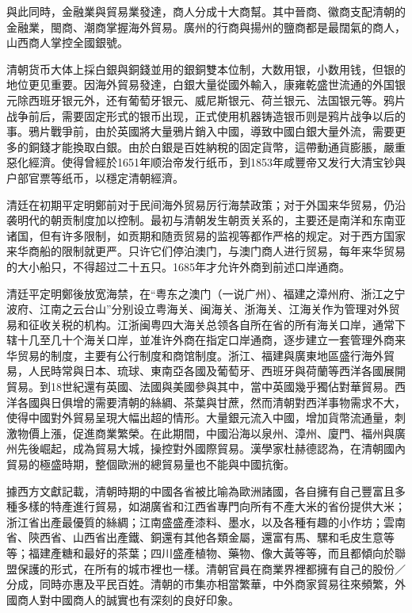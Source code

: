 與此同時，金融業與貿易業發達，商人分成十大商幫。其中晉商、徽商支配清朝的金融業，閩商、潮商掌握海外貿易。廣州的行商與揚州的鹽商都是最闊氣的商人，山西商人掌控全國銀號。

清朝货币大体上採白銀與銅錢並用的銀銅雙本位制，大数用银，小数用钱，但银的地位更见重要。因海外貿易發達，白銀大量從國外輸入，康雍乾盛世流通的外国银元除西班牙银元外，还有葡萄牙银元、威尼斯银元、荷兰银元、法国银元等。鸦片战争前后，需要固定形式的银币出现，正式使用机器铸造银币则是鸦片战争以后的事。鴉片戰爭前，由於英國將大量鴉片銷入中國，導致中國白銀大量外流，需要更多的銅錢才能換取白銀。由於白銀是百姓納稅的固定貨幣，這帶動通貨膨脹，嚴重惡化經濟。使得曾經於1651年顺治帝发行纸币，到1853年咸豐帝又发行大清宝钞與户部官票等纸币，以穩定清朝經濟。

清廷在初期平定明鄭前对于民间海外贸易厉行海禁政策；对于外国来华贸易，仍沿袭明代的朝贡制度加以控制。最初与清朝发生朝贡关系的，主要还是南洋和东南亚诸国，但有许多限制，如贡期和随贡贸易的监视等都作严格的规定。对于西方国家来华商船的限制就更严。只许它们停泊澳门，与澳门商人进行贸易，每年来华贸易的大小船只，不得超过二十五只。1685年才允许外商到前述口岸通商。

清廷平定明鄭後放宽海禁，在“粤东之澳门（一说广州）、福建之漳州府、浙江之宁波府、江南之云台山”分别设立粤海关、闽海关、浙海关、江海关作为管理对外贸易和征收关税的机构。江浙闽粤四大海关总领各自所在省的所有海关口岸，通常下辖十几至几十个海关口岸，並准许外商在指定口岸通商，逐步建立一套管理外商来华贸易的制度，主要有公行制度和商馆制度。浙江、福建與廣東地區盛行海外貿易，人民時常與日本、琉球、東南亞各國及葡萄牙、西班牙與荷蘭等西洋各國展開貿易。到18世紀還有英國、法國與美國參與其中，當中英國幾乎獨佔對華貿易。西洋各國與日俱增的需要清朝的絲綢、茶葉與甘蔗，然而清朝對西洋事物需求不大，使得中國對外貿易呈現大幅出超的情形。大量銀元流入中國，增加貨幣流通量，刺激物價上漲，促進商業繁榮。在此期間，中國沿海以泉州、漳州、廈門、福州與廣州先後崛起，成為貿易大城，操控對外國際貿易。漢學家杜赫德認為，在清朝國內貿易的極盛時期，整個歐洲的總貿易量也不能與中國抗衡。

據西方文獻記載，清朝時期的中國各省被比喻為歐洲諸國，各自擁有自己豐富且多種多樣的特產進行貿易，如湖廣省和江西省專門向所有不產大米的省份提供大米；浙江省出產最優質的絲綢；江南盛盛產漆料、墨水，以及各種有趣的小作坊；雲南省、陝西省、山西省出產鐵、銅還有其他各類金屬，還富有馬、騾和毛皮生意等等；福建產糖和最好的茶葉；四川盛產植物、藥物、像大黃等等，而且都傾向於聯盟保護的形式，在所有的城市裡也一樣。清朝官員在商業界裡都擁有自己的股份／分成，同時亦惠及平民百姓。清朝的市集亦相當繁華，中外商家貿易往來頻繁，外國商人對中國商人的誠實也有深刻的良好印象。

